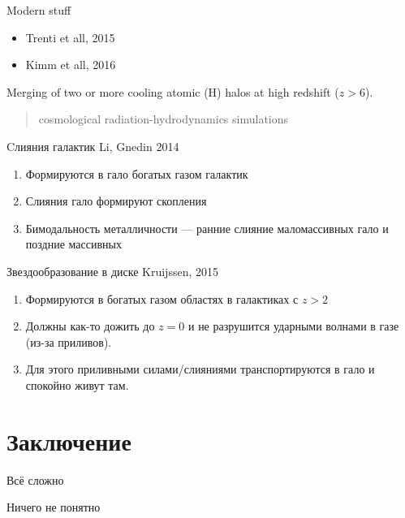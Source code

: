\documentclass{beamer}
\begin{document}
\begin{frame}{Modern stuff}

\begin{itemize}
    \item Trenti et all, 2015
    \item Kimm et all, 2016
\end{itemize}

\vspace{1em}

Merging of two or more cooling atomic (H) halos at high redshift
($z > 6$).

\begin{quote}
    cosmological radiation-hydrodynamics simulations
\end{quote}
\end{frame}

\begin{frame}{Cлияния галактик}
    Li, Gnedin 2014
    
    \vspace{1em}
    
    \begin{enumerate}
        \item Формируются в гало богатых газом галактик
        \item Слияния гало формируют скопления
        \item Бимодальность металличности --- ранние слияние маломассивных гало и поздние массивных
    \end{enumerate}
    
\end{frame}

\begin{frame}{Звездообразование в диске}
    Kruijssen, 2015
    
    \vspace{1em}
    
    \begin{enumerate}
        \item Формируются в богатых газом областях в галактиках с $z>2$
        \item Должны как-то дожить до $z=0$ и не разрушится ударными
        волнами в газе (из-за приливов).
        \item Для этого приливными силами/слияниями транспортируются в гало
        и спокойно живут там.
    \end{enumerate}
\end{frame}

\section{Заключение}
\begin{frame}
\begin{center}
\Huge
    Всё сложно

\vspace{1em}

\Huge 
    Ничего не понятно
\end{center}
\end{frame}
\end{document}
